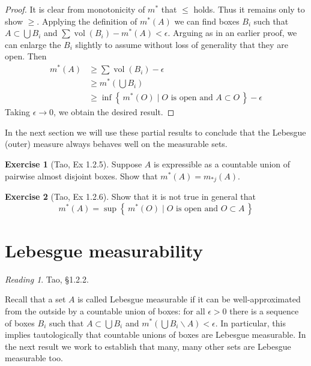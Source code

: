 \documentclass[11pt,oneside]{amsbook}
\newcommand{\set}[1]{\left\{\,#1\,\right\}}
\renewcommand{\setminus}{\smallsetminus}
\DeclareMathOperator{\vol}{vol}
\theoremstyle{definition}
\newtheorem{exerc}{Exercise}[section]
\theoremstyle{plain}
\theoremstyle{definition}
\theoremstyle{remark}
\newtheorem*{reading}{Reading}
\numberwithin{equation}{section}
\numberwithin{figure}{section}
\begin{document}
\begin{proof}
  It is clear from monotonicity of $m^*$ that $\leq$ holds. Thus it remains only to show $\geq$. Applying the definition of $m^*(A)$ we can find boxes $B_i$ such that $A\subset\bigcup B_i$ and $\sum\vol(B_i)-m^*(A)<\epsilon$. Arguing as in an earlier proof, we can enlarge the $B_i$ slightly to assume without loss of generality that they are open. Then
  \begin{align*}
    m^*(A)&\geq\sum\vol(B_i)-\epsilon\\
          &\geq m^*(\bigcup B_i)\\
          &\geq \inf\set{m^*(O)\mid\text{$O$ is open and }A\subset O}-\epsilon
  \end{align*}
  Taking $\epsilon\to0$, we obtain the desired result.
\end{proof}

In the next section we will use these partial results to conclude that the Lebesgue (outer) measure always behaves well on the measurable sets.

\begin{exerc}[Tao, Ex 1.2.5]
  Suppose $A$ is expressible as a countable union of pairwise almost disjoint boxes. Show that $m^*(A)=m_{*j}(A)$.
\end{exerc}

\begin{exerc}[Tao, Ex 1.2.6]
  Show that it is not true in general that
  \[m^*(A)=\sup\set{m^*(O)\mid\text{$O$ is open and }O\subset A}
  \]
\end{exerc}


\newpage
\section{Lebesgue measurability}

\begin{reading}
  Tao, \S 1.2.2.
\end{reading}

Recall that a set $A$ is called Lebesgue measurable if it can be well-approximated from the outside by a countable union of boxes: for all $\epsilon>0$ there is a sequence of boxes $B_i$ such that $A\subset\bigcup B_i$ and $m^*(\bigcup B_i\setminus A)<\epsilon$. In particular, this implies tautologically that countable unions of boxes are Lebesgue measurable. In the next result we work to establish that many, many other sets are Lebesgue measurable too.
\end{document}
